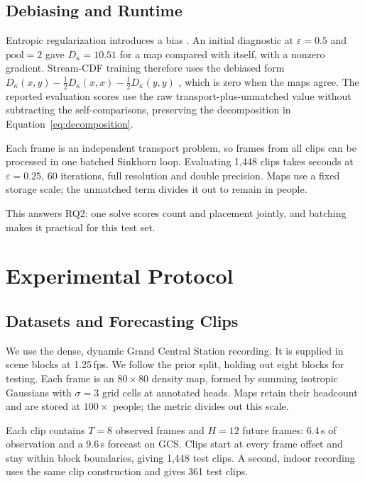 \documentclass{article}
\begin{document}
\subsection{Debiasing and Runtime}
\label{sec:motivation-computation}

Entropic regularization introduces a bias \cite{cuturi2013}. An initial diagnostic at $\varepsilon = 0.5$ and $\text{pool} = 2$ gave $D_\kappa = 10.51$ for a map compared with itself, with a nonzero gradient. Stream-CDF training therefore uses the debiased form $D_\kappa(x,y) - \tfrac{1}{2} D_\kappa(x,x) - \tfrac{1}{2} D_\kappa(y,y)$ \cite{feydy2019}, which is zero when the maps agree. The reported evaluation scores use the raw transport-plus-unmatched value without subtracting the self-comparisons, preserving the decomposition in Equation~\ref{eq:decomposition}.

Each frame is an independent transport problem, so frames from all clips can be processed in one batched Sinkhorn loop. Evaluating 1{,}448 clips takes seconds at $\varepsilon = 0.25$, 60 iterations, full resolution and double precision. Maps use a fixed storage scale; the unmatched term divides it out to remain in people.

This answers RQ2: one solve scores count and placement jointly, and batching makes it practical for this test set.

\section{Experimental Protocol}
\label{sec:experimental-setup}

\subsection{Datasets and Forecasting Clips}
\label{sec:setup-data}

We use the dense, dynamic Grand Central Station recording. It is supplied in scene blocks at 1.25\,fps. We follow the prior split, holding out eight blocks for testing. Each frame is an $80 \times 80$ density map, formed by summing isotropic Gaussians with $\sigma = 3$ grid cells at annotated heads. Maps retain their headcount and are stored at $100\times$ people; the metric divides out this scale.

Each clip contains $T = 8$ observed frames and $H = 12$ future frames: $6.4$\,s of observation and a $9.6$\,s forecast on GCS. Clips start at every frame offset and stay within block boundaries, giving 1{,}448 test clips. A second, indoor recording uses the same clip construction and gives 361 test clips.
\end{document}
